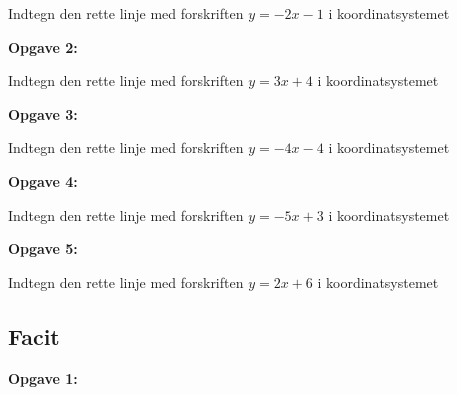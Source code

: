 Indtegn den rette linje med forskriften $y = -2x - 1$ i koordinatsystemet

\textbf{Opgave 2:}

Indtegn den rette linje med forskriften $y = 3x + 4$ i koordinatsystemet

\textbf{Opgave 3:}

Indtegn den rette linje med forskriften $y = -4x -4$ i koordinatsystemet

\textbf{Opgave 4:}

Indtegn den rette linje med forskriften $y = -5x + 3$ i koordinatsystemet

\textbf{Opgave 5:}

Indtegn den rette linje med forskriften $y = 2x + 6$ i koordinatsystemet





\newpage

\subsection*{Facit}

\textbf{Opgave 1:}


